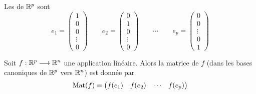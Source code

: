 \begin{frame}
\begin{mydefinition}
Les  de $\mathbb{R}^p$ sont
$$
e_1 = \begin{pmatrix} 1\\0\\0\\\vdots\\0\end{pmatrix}\qquad 
e_2 = \begin{pmatrix} 0\\1\\0\\\vdots\\0\end{pmatrix}\qquad\cdots\qquad
e_p = \begin{pmatrix} 0\\0\\\vdots\\0\\1\end{pmatrix}
$$
\end{mydefinition}

\pause

\begin{corollaire}
Soit $f: \mathbb{R}^p \longrightarrow \mathbb{R}^n$ une application linéaire. 
Alors la matrice de $f$ (dans les bases canoniques 
de $\mathbb{R}^p$ vers $\mathbb{R}^n$) est donnée par 
$$\mathop{\text{Mat}}\nolimits(f) = \begin{pmatrix} f(e_1)&f(e_2)& \cdots& f(e_p)\end{pmatrix}$$
\end{corollaire}

\end{frame}


